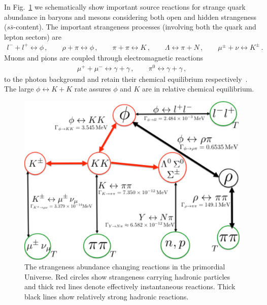 \documentclass[universe,article,submit,moreauthors,pdftex,a4paper]{Definitions/mdpi}
\newcommand*{\rf}[1]{Fig.~{\ref{#1}}}
\begin{document}
In \rf{Strangeness_map2} we schematically show important source reactions for strange quark abundance in baryons and mesons considering both open and hidden strangeness ($s\bar s$-content). The important strangeness processes (involving both the quark and lepton sectors) are 
\begin{align}
 l^-+l^+\leftrightarrow\phi\,,\qquad\rho+\pi\leftrightarrow\phi\,,\qquad\pi+\pi\leftrightarrow K\,,\qquad
 \Lambda \leftrightarrow \pi+ N\,,\qquad\mu^\pm+\nu\leftrightarrow K^\pm\,.
\end{align}
Muons and pions are coupled through electromagnetic reactions 
\begin{align}
 \mu^++\mu^-\leftrightarrow\gamma+\gamma\,,\qquad \pi^0\leftrightarrow\gamma+\gamma\,,
\end{align}
to the photon background and retain their chemical equilibrium respectively~\cite{Rafelski:2021aey,Kuznetsova:2008jt}. The large $\phi\leftrightarrow K+K$ rate assures $\phi$ and $K$ are in relative chemical equilibrium. 

\begin{figure}[ht]
\centering
\includegraphics[width=0.8\linewidth]{./plots/Strangeness002_new.pdf}
\caption{The strangeness abundance changing reactions in the primordial Universe. Red circles show strangeness carrying hadronic particles and thick red lines denote effectively instantaneous reactions. Thick black lines show relatively strong hadronic reactions.}
\label{Strangeness_map2}
\end{figure}
\end{document}
